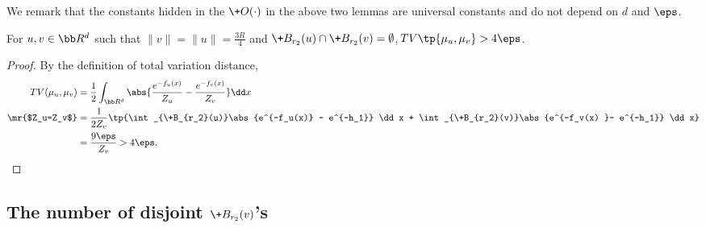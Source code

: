 We remark that the constants hidden in the $\+O(\cdot)$ in the above two lemmas are universal constants and do not depend on $d$ and $\eps$. 


\begin{lemma}\label{lem:TV}
    For $u,v\in \bb R^d$ such that $\|v\|=\|u\|=\frac{3R}{4}$ and $\+B_{r_2}(u)\cap \+B_{r_2}(v)=\emptyset$, $\DTV\tp{\mu_u,\mu_v}> 4\eps$.
\end{lemma}
\begin{proof}
    By the definition of total variation distance, 
    \begin{align*}
        \DTV(\mu_u,\mu_v) & = \frac{1}{2}\int_{\bb R^d} \abs{\frac{e^{-f_u(x)}}{Z_u} - \frac{e^{-f_v(x)}}{Z_v}} \dd x \\
        \mr{$Z_u=Z_v$} & =\frac{1}{2Z_v} \tp{\int_{\+B_{r_2}(u)}\abs{e^{-f_u(x)} - e^{-h_1}} \dd x + \int_{\+B_{r_2}(v)}\abs{e^{-f_v(x) }- e^{-h_1}} \dd x} \\
        &= \frac{9\eps}{Z_v} > 4\eps.
    \end{align*}
\end{proof}

\subsection{The number of disjoint $\+B_{r_2}(v)$'s}


